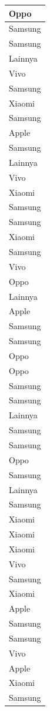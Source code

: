 \documentclass[
  letterpaper,
  DIV=11,
  numbers=noendperiod]{scrartcl}
\begin{document}
\begin{table}
\begin{tabular}[t]{l}
\hline
Oppo\\
\hline
Samsung\\
\hline
Samsung\\
\hline
Lainnya\\
\hline
Vivo\\
\hline
Samsung\\
\hline
Xiaomi\\
\hline
Samsung\\
\hline
Apple\\
\hline
Samsung\\
\hline
Lainnya\\
\hline
Vivo\\
\hline
Xiaomi\\
\hline
Samsung\\
\hline
Samsung\\
\hline
Xiaomi\\
\hline
Samsung\\
\hline
Vivo\\
\hline
Oppo\\
\hline
Lainnya\\
\hline
Apple\\
\hline
Samsung\\
\hline
Samsung\\
\hline
Oppo\\
\hline
Oppo\\
\hline
Samsung\\
\hline
Samsung\\
\hline
Lainnya\\
\hline
Samsung\\
\hline
Samsung\\
\hline
Oppo\\
\hline
Samsung\\
\hline
Lainnya\\
\hline
Samsung\\
\hline
Xiaomi\\
\hline
Xiaomi\\
\hline
Xiaomi\\
\hline
Vivo\\
\hline
Samsung\\
\hline
Xiaomi\\
\hline
Apple\\
\hline
Samsung\\
\hline
Samsung\\
\hline
Vivo\\
\hline
Apple\\
\hline
Xiaomi\\
\hline
Samsung\\

\end{tabular}
\end{table}
\end{document}
